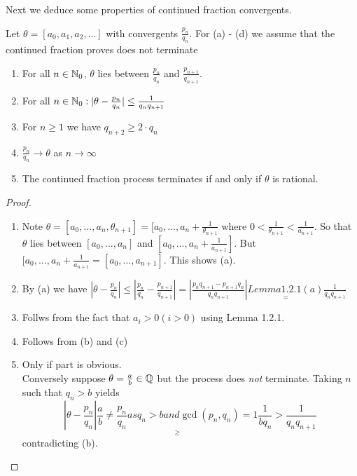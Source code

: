 \documentclass[NumTh.tex]{subfiles}
\begin{document}
Next we deduce some properties of continued fraction convergents.

\begin{theorem}
  Let $\theta = [a_0,a_1,a_2,\dots ]$ with convergents $\frac{p_n}{q_n}$.
  For (a) - (d) we assume that the continued fraction proves does not terminate
  \begin{enumerate} %
    \item For all $n \in \mathbb{N}_0$, $\theta$ lies between $\frac{p_n}{q_n}$ and $\frac{p_{n+1}}{q_{n+1}}$.
    \item For all $n \in \mathbb{N}_0: |\theta - \frac{p_n}{q_n} | \leq \frac{1}{q_n q_{n+1}}$
    \item For $n \geq 1$ we have $q_{n+2} \geq 2\cdot q_n$
    \item $\frac{p_n}{q_n} \to \theta$ as $n \to \infty$
    \item The continued fraction process terminates if and only if $\theta$ is rational.
  \end{enumerate}
\end{theorem}

\begin{proof}
  \begin{enumerate}
    \item Note $\theta = [a_0,\dots,a_n,\theta_{n+1} ] = [a_0,\dots,a_n+\frac{1}{\theta_{n+1}}$
    where $0 < \frac{1}{\theta_{n+1}} < \frac{1}{a_{n+1}}$. So that $\theta$ lies between $[a_0,\dots,a_n]$ and $[a_0,\dots,a_n + \frac{1}{a_{n+1}} ]$.
    But $[a_0,\dots,a_n + \frac{1}{a_{n+1}} = [a_0,\dots,a_{n+1}]$. This shows (a).
    \item By (a) we have $|\theta - \frac{p_n}{q_n} | \leq |\frac{p_n}{q_n} - \frac{p_{n+1}}{q_{n+1}}| = | \frac{p_n q_{n+1} - p_{n+1} q_n}{q_n q_{n+1}} | \underset{=}{Lemma 1.2.1(a)} \frac{1}{q_n q_{n+1}}$
    \item Follws from the fact that $a_i >0 (i > 0 )$ using Lemma 1.2.1.
    \item Follows from (b) and (c)
    \item Only if part is obvious.\\
    Conversely suppose $\theta = \frac{a}{b} \in \mathbb{Q}$ but the process does \emph{not} terminate. Taking $n$ such that $q_n > b$ yields
    \[ | \theta - \frac{p_n}{q_n} | \underset{\geq}{\frac{a}{b} \neq \frac{p_n}{q_n} as q_n > b and \gcd(p_n,q_n) = 1} \frac{1}{b q_n} > \frac{1}{q_n q_{n+1}} \]
    contradicting (b).
  \end{enumerate}
\end{proof}
\end{document}
